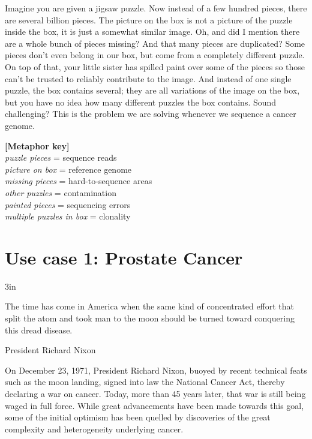 \begin{justify}
\begin{center}
\begin{minipage}{5in}
\begin{center}
{Imagine you are given a jigsaw puzzle. Now instead of a few hundred pieces, there are several billion pieces. The picture on the box is not a picture of the puzzle inside the box, it is just a somewhat similar image. Oh, and did I mention there are a whole bunch of pieces missing? And that many pieces are duplicated? Some pieces don't even belong in our box, but come from a completely different puzzle. On top of that, your little sister has spilled paint over some of the pieces so those can't be trusted to reliably contribute to the image. And instead of one single puzzle, the box contains several; they are all variations of the image on the box, but you have no idea how many different puzzles the box contains. Sound challenging? This is the problem we are solving whenever we sequence a cancer genome.

\vspace*{0.5cm}
\textbf{[Metaphor key]} \\
\textit{puzzle pieces} = sequence reads \\
\textit{picture on box} = reference genome \\
\textit{missing pieces} = hard-to-sequence areas \\
\textit{other puzzles} = contamination \\
\textit{painted pieces} = sequencing errors \\
\textit{multiple puzzles in box} = clonality
}

\end{center}
\end{minipage}
\end{center}



\newpage
\section{Use case 1: Prostate Cancer}

\epigraph{3in}{The time has come in America when the same kind of concentrated effort that split the atom and took man to the moon should be turned toward conquering this dread disease.}{President Richard Nixon}

On December 23, 1971, President Richard Nixon, buoyed by recent technical feats such as the moon landing, signed into law the National Cancer Act, thereby declaring a war on cancer. Today, more than 45 years later, that war is still being waged in full force. While great advancements have been made towards this goal, some of the initial optimism has been quelled by discoveries of the great complexity and heterogeneity underlying cancer.



\end{justify}
